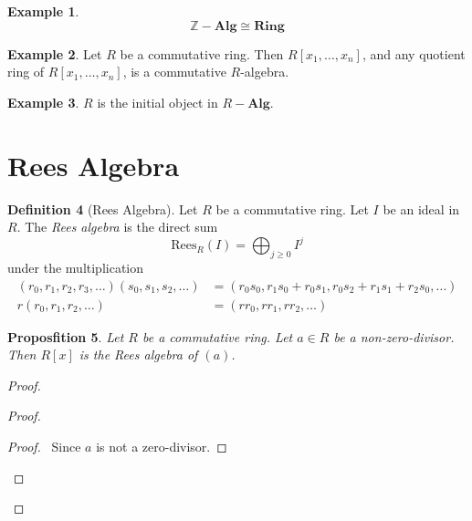 \documentclass{book}
\let\qed\relax
\newtheorem{prop}{Proposfition}[chapter]
\theoremstyle{definition}
\newtheorem{df}[prop]{Definition}
\newtheorem{ex}[prop]{Example}
\newcommand{\Alg}[1]{\ensuremath{{#1}-\mathbf{Alg}}}
\newcommand{\Ring}{\ensuremath{\mathbf{Ring}}}
\begin{document}
\begin{ex}
\[ \Alg{\mathbb{Z}} \cong \Ring \]
\end{ex}

\begin{ex}
Let $R$ be a commutative ring. Then $R[x_1, \ldots, x_n]$, and any quotient ring of $R[x_1, \ldots, x_n]$, is a commutative $R$-algebra.
\end{ex}

\begin{ex}
$R$ is the initial object in $\Alg{R}$.
\end{ex}

\section{Rees Algebra}

\begin{df}[Rees Algebra]
Let $R$ be a commutative ring. Let $I$ be an ideal in $R$. The \emph{Rees algebra} is the direct sum
\[ \mathrm{Rees}_R(I) = \bigoplus_{j \geq 0} I^j \]
under the multiplication 
\begin{align*}
(r_0, r_1, r_2, r_3, \ldots)(s_0, s_1, s_2, \ldots) & = (r_0s_0, r_1s_0 + r_0s_1, r_0s_2 + r_1s_1 + r_2s_0, \ldots) \\
r(r_0, r_1, r_2, \ldots) & = (rr_0, rr_1, rr_2, \ldots)
\end{align*}
\end{df}

\begin{prop}
Let $R$ be a commutative ring. Let $a \in R$ be a non-zero-divisor. Then $R[x]$ is the Rees algebra of $(a)$.
\end{prop}

\begin{proof}
\pf
{}
\begin{proof}
	\begin{proof}
		\pf\ Since $a$ is not a zero-divisor.
	\end{proof}
\end{proof}
\qed
\end{proof}
\end{document}
